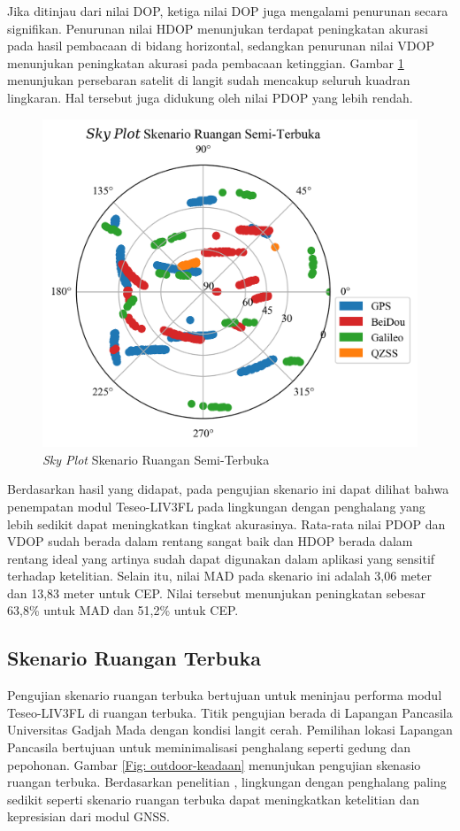 Jika ditinjau dari nilai DOP, ketiga nilai DOP juga mengalami penurunan secara signifikan. Penurunan nilai HDOP menunjukan terdapat peningkatan akurasi pada hasil pembacaan di bidang horizontal, sedangkan penurunan nilai VDOP menunjukan peningkatan akurasi pada pembacaan ketinggian. Gambar \ref{Fig: semioutdoor-sky_plot} menunjukan persebaran satelit di langit sudah mencakup seluruh kuadran lingkaran. Hal tersebut juga didukung oleh nilai PDOP yang lebih rendah.

\begin{figure}[H]
	\centering
	\captionsetup{justification=centering}
	\includegraphics[width=12cm]{contents/chapter-4/3-skenario-semioutdoor/sky_plot.png}
	\caption{\textit{Sky Plot} Skenario Ruangan Semi-Terbuka}
	\label{Fig: semioutdoor-sky_plot}
\end{figure}

Berdasarkan hasil yang didapat, pada pengujian skenario ini dapat dilihat bahwa penempatan modul Teseo-LIV3FL pada lingkungan dengan penghalang yang lebih sedikit dapat meningkatkan tingkat akurasinya. Rata-rata nilai PDOP dan VDOP sudah berada dalam rentang sangat baik dan HDOP berada dalam rentang ideal yang artinya sudah dapat digunakan dalam aplikasi yang sensitif terhadap ketelitian. Selain itu, nilai MAD pada skenario ini adalah 3,06 meter dan 13,83 meter untuk CEP. Nilai tersebut menunjukan peningkatan sebesar 63,8\% untuk MAD dan 51,2\% untuk CEP.

\subsection{Skenario Ruangan Terbuka}
Pengujian skenario ruangan terbuka bertujuan untuk meninjau performa modul Teseo-LIV3FL di ruangan terbuka. Titik pengujian berada di Lapangan Pancasila Universitas Gadjah Mada dengan kondisi langit cerah. Pemilihan lokasi Lapangan Pancasila bertujuan untuk meminimalisasi penghalang seperti gedung dan pepohonan. Gambar \ref{Fig: outdoor-keadaan} menunjukan pengujian skenasio ruangan terbuka. Berdasarkan penelitian \cite{Lu2018}, lingkungan dengan penghalang paling sedikit seperti skenario ruangan terbuka dapat meningkatkan ketelitian dan kepresisian dari modul GNSS.


